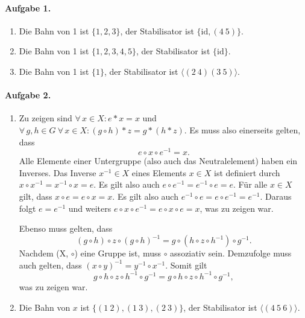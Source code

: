 \documentclass{article}
\begin{document}
\paragraph{Aufgabe 1.}

\begin{enumerate}
    \item Die Bahn von 1 ist $\{ 1, 2, 3 \}$, der Stabilisator ist $\{ \text{id}, (4\ 5) \}$.
    
    \item Die Bahn von 1 ist $\{ 1, 2, 3, 4, 5 \}$, der Stabilisator ist $\{ \text{id} \}$.
    
    \item Die Bahn von 1 ist $\{ 1 \}$, der Stabilisator ist $\langle(2\ 4)(3\ 5)\rangle$.
\end{enumerate}

\paragraph{Aufgabe 2.}

\begin{enumerate}
    \item Zu zeigen sind $\forall\, x \in X : e * x = x$ und $\forall\, g, h \in G\ \forall\, x \in X : (g \circ h) * z = g * (h * z)$. Es muss also einerseits gelten, dass
    \begin{equation*}
        e \circ x \circ e^{-1} = x.
    \end{equation*}
    Alle Elemente einer Untergruppe (also auch das Neutralelement) haben ein Inverses. Das Inverse $x^{-1} \in X$ eines Elements $x \in X$ ist definiert durch $x \circ x^{-1} = x^{-1} \circ x = e$. Es gilt also auch $e \circ e^{-1} = e^{-1} \circ e = e$. Für alle $x \in X$ gilt, dass $x \circ e = e \circ x = x$. Es gilt also auch $e^{-1} \circ e = e \circ e^{-1} = e^{-1}$. Daraus folgt $e = e^{-1}$ und weiters $e \circ x \circ e^{-1} = e \circ x \circ e = x$, was zu zeigen war.

    Ebenso muss gelten, dass
    \begin{equation*}
        (g \circ h) \circ z \circ (g \circ h)^{-1} = g \circ (h \circ z \circ h^{-1}) \circ g^{-1}.
    \end{equation*}
    Nachdem (X, $\circ$) eine Gruppe ist, muss $\circ$ assoziativ sein. Demzufolge muss auch gelten, dass $(x \circ y)^{-1} = y^{-1} \circ x^{-1}$. Somit gilt
    \begin{equation*}
        g \circ h \circ z \circ h^{-1} \circ g^{-1} = g \circ h \circ z \circ h^{-1} \circ g^{-1},
    \end{equation*}
    was zu zeigen war.

    \item Die Bahn von $x$ ist $\{ (1\ 2), (1\ 3), (2\ 3) \}$, der Stabilisator ist $\langle(4\ 5\ 6)\rangle$.
\end{enumerate}
\end{document}
